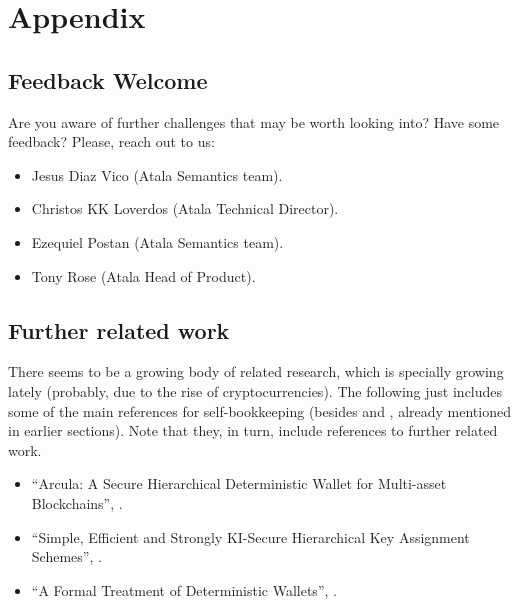 \section{Appendix}

\subsection{Feedback Welcome}

Are you aware of further challenges that may be worth looking into? Have some
feedback? Please, reach out to us:

\begin{itemize}
\item Jesus Diaz Vico (Atala Semantics team).
\item Christos KK Loverdos (Atala Technical Director).
\item Ezequiel Postan (Atala Semantics team).
\item Tony Rose (Atala Head of Product).
\end{itemize}

\subsection{Further related work}

There seems to be a growing body of related research, which is specially
growing lately (probably, due to the rise of cryptocurrencies). The following
just includes some of the main references for self-bookkeeping (besides
\cite{kkl20} and \cite{def+21}, already mentioned in earlier sections). Note
that they, in turn, include references to further related work.

\begin{itemize}
\item ``Arcula: A Secure Hierarchical Deterministic Wallet for Multi-asset
  Blockchains'', \cite{lfa20}.
\item ``Simple, Efficient and Strongly KI-Secure Hierarchical Key Assignment
  Schemes'', \cite{fpp13}.
\item ``A Formal Treatment of Deterministic Wallets'', \cite{dfl19}.
\end{itemize}

